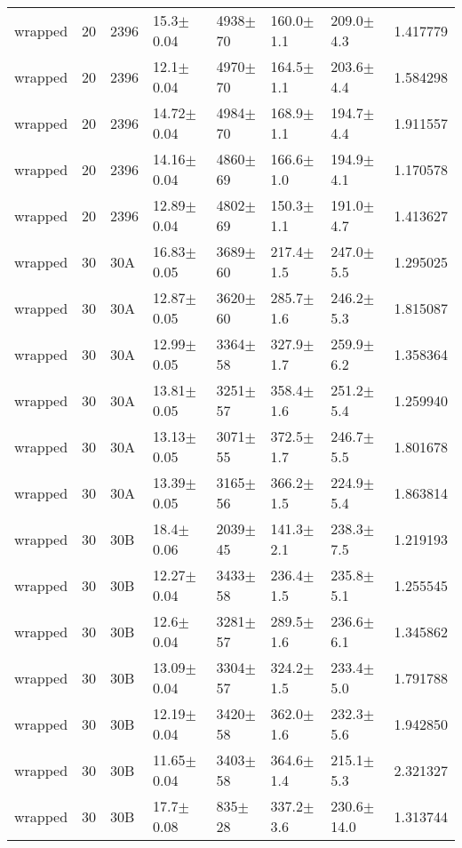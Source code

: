 \begin{tabular}{lrlllllr}
      wrapped &      20 &    2396 &    15.3$\pm$0.04 &  4938$\pm$70 &   160.0$\pm$1.1 &   209.0$\pm$4.3 &    1.417779 \\
      wrapped &      20 &    2396 &    12.1$\pm$0.04 &  4970$\pm$70 &   164.5$\pm$1.1 &   203.6$\pm$4.4 &    1.584298 \\
      wrapped &      20 &    2396 &   14.72$\pm$0.04 &  4984$\pm$70 &   168.9$\pm$1.1 &   194.7$\pm$4.4 &    1.911557 \\
      wrapped &      20 &    2396 &   14.16$\pm$0.04 &  4860$\pm$69 &   166.6$\pm$1.0 &   194.9$\pm$4.1 &    1.170578 \\
      wrapped &      20 &    2396 &   12.89$\pm$0.04 &  4802$\pm$69 &   150.3$\pm$1.1 &   191.0$\pm$4.7 &    1.413627 \\
      wrapped &      30 &     30A &   16.83$\pm$0.05 &  3689$\pm$60 &   217.4$\pm$1.5 &   247.0$\pm$5.5 &    1.295025 \\
      wrapped &      30 &     30A &   12.87$\pm$0.05 &  3620$\pm$60 &   285.7$\pm$1.6 &   246.2$\pm$5.3 &    1.815087 \\
      wrapped &      30 &     30A &   12.99$\pm$0.05 &  3364$\pm$58 &   327.9$\pm$1.7 &   259.9$\pm$6.2 &    1.358364 \\
      wrapped &      30 &     30A &   13.81$\pm$0.05 &  3251$\pm$57 &   358.4$\pm$1.6 &   251.2$\pm$5.4 &    1.259940 \\
      wrapped &      30 &     30A &   13.13$\pm$0.05 &  3071$\pm$55 &   372.5$\pm$1.7 &   246.7$\pm$5.5 &    1.801678 \\
      wrapped &      30 &     30A &   13.39$\pm$0.05 &  3165$\pm$56 &   366.2$\pm$1.5 &   224.9$\pm$5.4 &    1.863814 \\
      wrapped &      30 &     30B &    18.4$\pm$0.06 &  2039$\pm$45 &   141.3$\pm$2.1 &   238.3$\pm$7.5 &    1.219193 \\
      wrapped &      30 &     30B &   12.27$\pm$0.04 &  3433$\pm$58 &   236.4$\pm$1.5 &   235.8$\pm$5.1 &    1.255545 \\
      wrapped &      30 &     30B &    12.6$\pm$0.04 &  3281$\pm$57 &   289.5$\pm$1.6 &   236.6$\pm$6.1 &    1.345862 \\
      wrapped &      30 &     30B &   13.09$\pm$0.04 &  3304$\pm$57 &   324.2$\pm$1.5 &   233.4$\pm$5.0 &    1.791788 \\
      wrapped &      30 &     30B &   12.19$\pm$0.04 &  3420$\pm$58 &   362.0$\pm$1.6 &   232.3$\pm$5.6 &    1.942850 \\
      wrapped &      30 &     30B &   11.65$\pm$0.04 &  3403$\pm$58 &   364.6$\pm$1.4 &   215.1$\pm$5.3 &    2.321327 \\
      wrapped &      30 &     30B &    17.7$\pm$0.08 &   835$\pm$28 &   337.2$\pm$3.6 &  230.6$\pm$14.0 &    1.313744 \\
\hline
\end{tabular}




